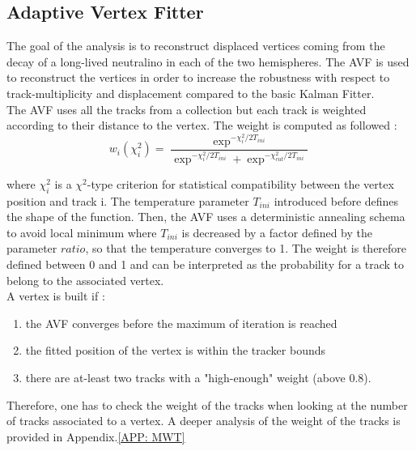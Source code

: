 \documentclass{cernatlasnote}
\begin{document}
\FloatBarrier

 \pagebreak
\subsection{Adaptive Vertex Fitter}
\label{APP: AVF}
The goal of the analysis is to reconstruct displaced vertices coming from the decay of a long-lived neutralino in each of the two hemispheres. The AVF is used to reconstruct the vertices in order to increase the robustness with respect to track-multiplicity and displacement compared to the basic Kalman Fitter. \\
The AVF uses all the tracks from a collection but each track is weighted according to their distance to the vertex. The weight is computed as followed :
\begin{equation}
        w_{i}(\chi^{2}_{i})= \frac{  \exp^{-\chi^{2}_{i}/2T_{ini}}  }{\exp^{-\chi^{2}_{i}/2T_{ini}} + \exp^{-\chi^{2}_{cut}/2T_{ini}}}
\end{equation}

where $\chi^{2}_{i}$ is a $\chi^{2}$-type criterion for statistical compatibility between the vertex position and track i. The temperature parameter $T_{ini}$ introduced before defines the shape of the function. Then, the AVF uses a deterministic annealing schema to avoid local minimum where $T_{ini}$ is decreased by a factor defined by the parameter $ratio$, so that the temperature converges to 1. The weight is therefore defined between 0 and 1 and can be interpreted as the probability for a track to belong to the associated vertex. \\

A vertex is built if :
    \begin{enumerate}
        \item the AVF converges before the maximum of iteration is reached
        \item the fitted position of the vertex is within the tracker bounds
        \item there are at-least two tracks with a "high-enough" weight (above 0.8). 
    \end{enumerate}

Therefore, one has to check the weight of the tracks when looking at the number of tracks associated  to a vertex. A deeper analysis of the weight of the tracks is provided in Appendix.\ref{APP: MWT}
\pagebreak
\end{document}
